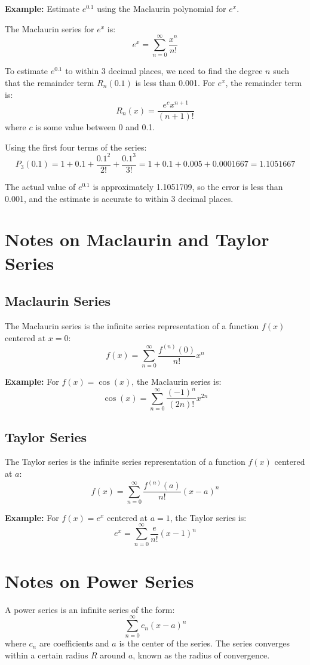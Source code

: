 \documentclass{article}
\begin{document}
\textbf{Example:}
Estimate \(e^{0.1}\) using the Maclaurin polynomial for \(e^x\).

The Maclaurin series for \(e^x\) is:
\[ e^x = \sum_{n=0}^{\infty} \frac{x^n}{n!} \]

To estimate \(e^{0.1}\) to within 3 decimal places, we need to find the degree \(n\) such that the remainder term \(R_n(0.1)\) is less than 0.001. For \(e^x\), the remainder term is:
\[ R_n(x) = \frac{e^c x^{n+1}}{(n+1)!} \]
where \(c\) is some value between 0 and 0.1.

Using the first four terms of the series:
\[ P_3(0.1) = 1 + 0.1 + \frac{0.1^2}{2!} + \frac{0.1^3}{3!} = 1 + 0.1 + 0.005 + 0.0001667 = 1.1051667 \]

The actual value of \(e^{0.1}\) is approximately 1.1051709, so the error is less than 0.001, and the estimate is accurate to within 3 decimal places.

\section*{Notes on Maclaurin and Taylor Series}

\subsection*{Maclaurin Series}
The Maclaurin series is the infinite series representation of a function \(f(x)\) centered at \(x = 0\):
\[ f(x) = \sum_{n=0}^{\infty} \frac{f^{(n)}(0)}{n!} x^n \]

\textbf{Example:}
For \(f(x) = \cos(x)\), the Maclaurin series is:
\[ \cos(x) = \sum_{n=0}^{\infty} \frac{(-1)^n}{(2n)!} x^{2n} \]

\subsection*{Taylor Series}
The Taylor series is the infinite series representation of a function \(f(x)\) centered at \(a\):
\[ f(x) = \sum_{n=0}^{\infty} \frac{f^{(n)}(a)}{n!} (x-a)^n \]

\textbf{Example:}
For \(f(x) = e^x\) centered at \(a = 1\), the Taylor series is:
\[ e^x = \sum_{n=0}^{\infty} \frac{e}{n!} (x-1)^n \]

\section*{Notes on Power Series}
A power series is an infinite series of the form:
\[ \sum_{n=0}^{\infty} c_n (x-a)^n \]
where \(c_n\) are coefficients and \(a\) is the center of the series. The series converges within a certain radius \(R\) around \(a\), known as the radius of convergence.
\end{document}
